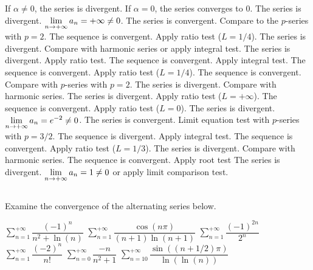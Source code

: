 \begin{Answer}

    \Question  If $\alpha \neq 0$, the series is divergent. If $\alpha = 0$, the series converges to 0.
    \Question  The series is divergent. $\displaystyle\lim_{n \to +\infty} a_n = +\infty \neq 0$.
    \Question The series is convergent. Compare to the $p$-series with $p=2$.
    \Question The sequence is convergent. Apply ratio test ($L=1/4$).
    \Question The series is divergent. Compare with harmonic series or apply integral test.
    \Question The series is divergent. Apply ratio test.
    \Question The sequence is convergent. Apply integral test.
    \Question The sequence is convergent. Apply ratio test ($L=1/4$).
    \Question The sequence is convergent. Compare with $p$-series with $p=2$.
    \Question The series is divergent. Compare with harmonic series.
    \Question The series is divergent. Apply ratio test ($L=+\infty$).
    \Question The sequence is convergent. Apply ratio test ($L=0$).
    \Question The series is divergent. $\displaystyle\lim_{n \to +\infty} a_n = e^{-2} \neq 0$. 
    \Question The series is convergent. Limit equation test with $p$-series with $p=3/2$.
    \Question The sequence is divergent. Apply integral test.
    \Question The sequence is convergent. Apply ratio test ($L=1/3$).
    \Question The series is divergent. Compare with harmonic series.
    \Question The sequence is convergent. Apply root test
    \Question The series is divergent. $\displaystyle\lim_{n \to +\infty} a_n = 1 \neq 0$ or apply limit comparison test. 
    
\end{Answer}

\subsection*{}
\begin{Exercise} Examine the convergence of the alternating series below.
\begin{multicols}{2}
    \Question[difficulty = 2] $\displaystyle\sum_{n=1}^{+\infty} \dfrac{(-1)^n}{n^2 + \ln (n)}$ 
    \Question[difficulty = 3] $\displaystyle\sum_{n=1}^{+\infty} \dfrac{\cos(n\pi)}{(n+1) \ln(n+1)}$ 
    \Question[difficulty = 1] $\displaystyle\sum_{n=1}^{+\infty} \dfrac{(-1)^{2n}}{2^n}$ 
    \Question[difficulty = 2] $\displaystyle\sum_{n=1}^{+\infty} \dfrac{(-2)^{n}}{n!}$ 
    \Question[difficulty = 1] $\displaystyle\sum_{n=0}^{+\infty} \dfrac{-n}{n^2+1}$ 
    \Question[difficulty = 3] $\displaystyle\sum_{n=10}^{+\infty} \dfrac{\sin\left((n+1/2)\pi\right)}{\ln \left( \ln(n) \right)}$
    \EndCurrentQuestion
\end{multicols}
\end{Exercise}


